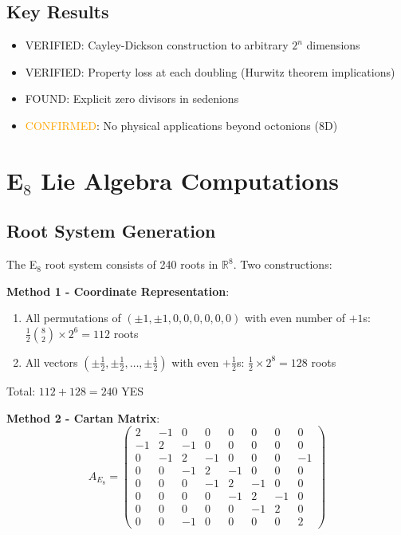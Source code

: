 \subsection{Key Results}

\begin{itemize}
    \item[$+$] \textcolor{validcolor}{VERIFIED}: Cayley-Dickson construction to arbitrary $2^n$ dimensions
    \item[$+$] \textcolor{validcolor}{VERIFIED}: Property loss at each doubling (Hurwitz theorem implications)
    \item[$+$] \textcolor{validcolor}{FOUND}: Explicit zero divisors in sedenions
    \item[$-$] \textcolor{orange}{CONFIRMED}: No physical applications beyond octonions (8D)
\end{itemize}

\section{E$_8$ Lie Algebra Computations}

\subsection{Root System Generation}

The E$_8$ root system consists of 240 roots in $\mathbb{R}^8$. Two constructions:

\textbf{Method 1 - Coordinate Representation}:
\begin{enumerate}
    \item All permutations of $(\pm 1, \pm 1, 0, 0, 0, 0, 0, 0)$ with even number of $+1$s: $\frac{1}{2}\binom{8}{2} \times 2^6 = 112$ roots
    \item All vectors $(\pm \frac{1}{2}, \pm \frac{1}{2}, \ldots, \pm \frac{1}{2})$ with even $+\frac{1}{2}$s: $\frac{1}{2} \times 2^8 = 128$ roots
\end{enumerate}

Total: $112 + 128 = 240$ \textcolor{validcolor}{YES}

\textbf{Method 2 - Cartan Matrix}:
\begin{equation}
A_{E_8} = \begin{pmatrix}
2 & -1 & 0 & 0 & 0 & 0 & 0 & 0 \\
-1 & 2 & -1 & 0 & 0 & 0 & 0 & 0 \\
0 & -1 & 2 & -1 & 0 & 0 & 0 & -1 \\
0 & 0 & -1 & 2 & -1 & 0 & 0 & 0 \\
0 & 0 & 0 & -1 & 2 & -1 & 0 & 0 \\
0 & 0 & 0 & 0 & -1 & 2 & -1 & 0 \\
0 & 0 & 0 & 0 & 0 & -1 & 2 & 0 \\
0 & 0 & -1 & 0 & 0 & 0 & 0 & 2
\end{pmatrix}
\end{equation}

